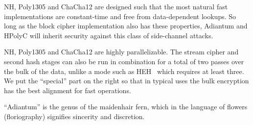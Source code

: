 \documentclass[eprint.tex]{subfiles}
\begin{document}
NH, Poly1305 and ChaCha12 are designed such that the most natural fast implementations are
constant-time and free from data-dependent lookups. So long as the block cipher implementation
also has these properties, Adiantum and HPolyC will inherit security against
this class of side-channel attacks.

NH, Poly1305 and ChaCha12 are highly parallelizable.
The stream cipher and second hash stages can also be run in combination for a total
of two passes over the bulk of the data, unlike a mode such as HEH~\cite{heh}
which requires at least three.
We put the ``special'' part on the right so that in typical uses the bulk encryption has
the best alignment for fast operations.

``Adiantum'' is the genus of the maidenhair fern, which in the language of
flowers (floriography) signifies sincerity and discretion.~\cite{fleurs}

\subbib
\end{document}
